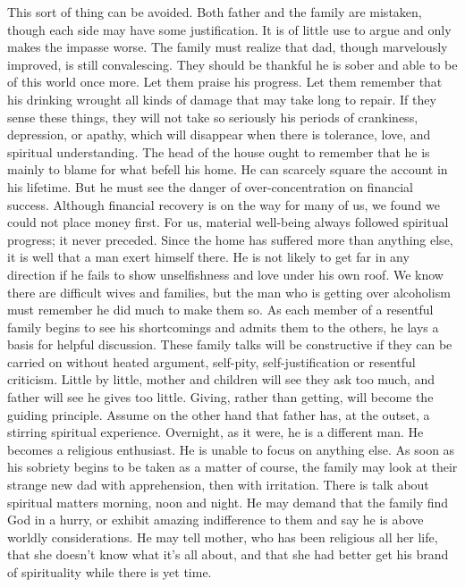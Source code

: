 \begin{biblechapter}
This sort of thing can be avoided.  Both father and the family are mistaken, though each side may have some justification.  It is of little use to argue and only makes the impasse worse.  The family must realize that dad, though marvelously improved, is still convalescing.  They should be thankful he is sober and able to be of this world once more.  Let them praise his progress.  Let them remember that his drinking wrought all kinds of damage that may take long to repair.  If they sense these things, they will not take so seriously his periods of crankiness, depression, or apathy, which will disappear when there is tolerance, love, and spiritual understanding.
The head of the house ought to remember that he is mainly to blame for what befell his home.  He can scarcely square the account in his lifetime.  But he must see the danger of over-concentration on financial success.  Although financial recovery is on the way for many of us, we found we could not place money first.  For us, material well-being always followed spiritual progress; it never preceded.
Since the home has suffered more than anything else, it is well that a man exert himself there.  He is not likely to get far in any direction if he fails to show unselfishness and love under his own roof.  We know there are difficult wives and families, but the man who is getting over alcoholism must remember he did much to make them so.
As each member of a resentful family begins to see his shortcomings and admits them to the others, he lays a basis for helpful discussion.  These family talks will be constructive if they can be carried on without heated argument, self-pity, self-justification or resentful criticism.  Little by little, mother and children will see they ask too much, and father will see he gives too little.  Giving, rather than getting, will become the guiding principle.
Assume on the other hand that father has, at the outset, a stirring spiritual experience.  Overnight, as it were, he is a different man.  He becomes a religious enthusiast.  He is unable to focus on anything else.  As soon as his sobriety begins to be taken as a matter of course, the family may look at their strange new dad with apprehension, then with irritation.  There is talk about spiritual matters morning, noon and night.  He may demand that the family find God in a hurry, or exhibit amazing indifference to them and say he is above worldly considerations.  He may tell mother, who has been religious all her life, that she doesn't know what it's all about, and that she had better get his brand of spirituality while there is yet time.

\end{biblechapter}
